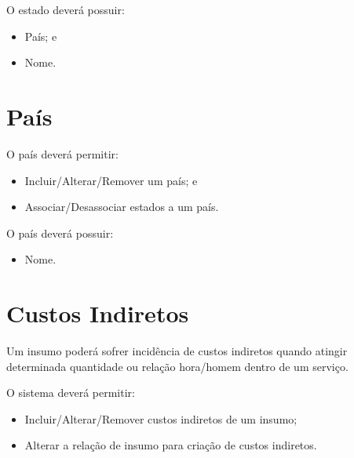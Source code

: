 O estado deverá possuir:

\begin{itemize}
	\item País; e
	\item Nome.
\end{itemize}

\section{País}

O país deverá permitir:

\begin{itemize}
	\item Incluir/Alterar/Remover um país; e
	\item Associar/Desassociar estados a um país.
\end{itemize}

O país deverá possuir:

\begin{itemize}
	\item Nome.
\end{itemize}

\section{Custos Indiretos}

Um insumo poderá sofrer incidência de custos indiretos quando atingir determinada quantidade ou relação hora/homem dentro de um serviço.

O sistema deverá permitir:

\begin{itemize}
	\item Incluir/Alterar/Remover custos indiretos de um insumo;
	\item Alterar a relação de insumo para criação de custos indiretos.
\end{itemize}